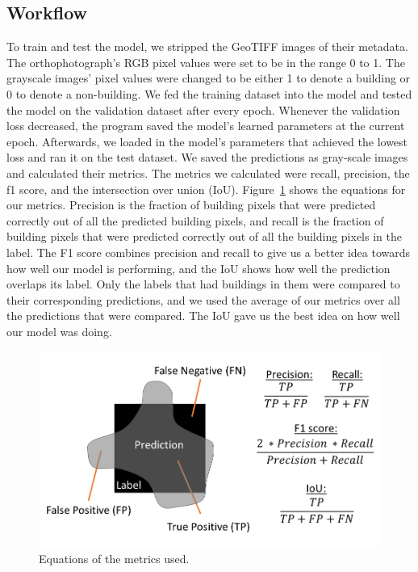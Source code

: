 \documentclass[acmtog, authorversion]{acmart}
\begin{document}
\subsection{Workflow}	
To train and test the model, we stripped the GeoTIFF images of their metadata. The orthophotograph's RGB pixel values were set to be in the range 0 to 1. The grayscale images’ pixel values were changed to be either 1 to denote a building or 0 to denote a non-building. We fed the training dataset into the model and tested the model on the validation dataset after every epoch. Whenever the validation loss decreased, the program saved the model’s learned parameters at the current epoch. Afterwards, we loaded in the model’s parameters that achieved the lowest loss and ran it on the test dataset. We saved the predictions as gray-scale images and calculated their metrics. The metrics we calculated were recall, precision, the f1 score, and the intersection over union (IoU). Figure~\ref{fig:metrics} shows the equations for our metrics. Precision is the fraction of building pixels that were predicted correctly out of all the predicted building pixels, and recall is the fraction of building pixels that were predicted correctly out of all the building pixels in the label. The F1 score combines precision and recall to give us a better idea towards how well our model is performing, and the IoU shows how well the prediction overlaps its label. Only the labels that had buildings in them were compared to their corresponding predictions, and we used the average of our metrics over all the predictions that were compared. The IoU gave us the best idea on how well our model was doing.

\begin{figure}
  \includegraphics[width=1.0\linewidth]{Images/Metrics.png}
  \caption{Equations of the metrics used.}
  \label{fig:metrics}
\end{figure}
\end{document}
